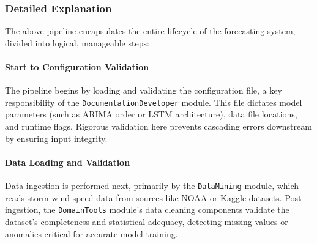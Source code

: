 \begin{center}
{
	}
\end{center}





\subsubsection*{Detailed Explanation}

The above pipeline encapsulates the entire lifecycle of the forecasting system, divided into logical, manageable steps:

\paragraph{Start to Configuration Validation}  
The pipeline begins by loading and validating the configuration file, a key responsibility of the \texttt{DocumentationDeveloper} module. This file dictates model parameters (such as ARIMA order or LSTM architecture), data file locations, and runtime flags. Rigorous validation here prevents cascading errors downstream by ensuring input integrity.

\paragraph{Data Loading and Validation}  
Data ingestion is performed next, primarily by the \texttt{DataMining} module, which reads storm wind speed data from sources like NOAA or Kaggle datasets. Post ingestion, the \texttt{DomainTools} module’s data cleaning components validate the dataset’s completeness and statistical adequacy, detecting missing values or anomalies critical for accurate model training.

